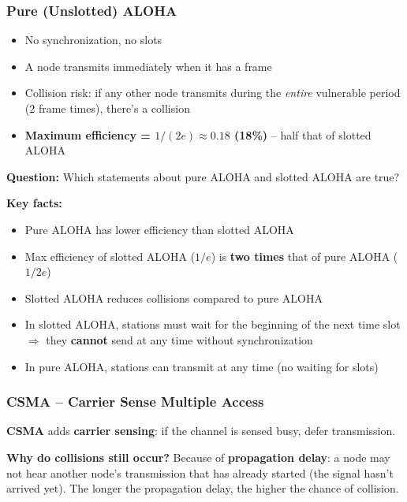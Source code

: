 \subsubsection{Pure (Unslotted) ALOHA}

\begin{keybox}
\begin{itemize}[noitemsep]
    \item No synchronization, no slots
    \item A node transmits immediately when it has a frame
    \item Collision risk: if any other node transmits during the \emph{entire} vulnerable period (2 frame times), there's a collision
    \item \textbf{Maximum efficiency = $1/(2e) \approx 0.18$ (18\%)} -- half that of slotted ALOHA
\end{itemize}
\end{keybox}

\begin{exambox}
\textbf{Question:} Which statements about pure ALOHA and slotted ALOHA are true?

\textbf{Key facts:}
\begin{itemize}[noitemsep]
    \item Pure ALOHA has lower efficiency than slotted ALOHA \checkmark
    \item Max efficiency of slotted ALOHA ($1/e$) is \textbf{two times} that of pure ALOHA ($1/2e$) \checkmark
    \item Slotted ALOHA reduces collisions compared to pure ALOHA \checkmark
    \item In slotted ALOHA, stations must wait for the beginning of the next time slot $\Rightarrow$ they \textbf{cannot} send at any time without synchronization
    \item In pure ALOHA, stations can transmit at any time (no waiting for slots)
\end{itemize}
\end{exambox}

\subsubsection{CSMA -- Carrier Sense Multiple Access}

\begin{keybox}
\textbf{CSMA} adds \textbf{carrier sensing}: if the channel is sensed busy, defer transmission.

\medskip
\textbf{Why do collisions still occur?} Because of \textbf{propagation delay}: a node may not hear another node's transmission that has already started (the signal hasn't arrived yet). The longer the propagation delay, the higher the chance of collision.
\end{keybox}

